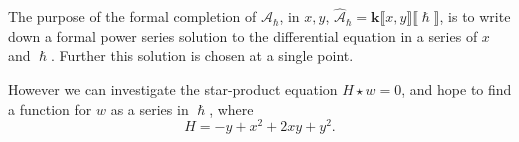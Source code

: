     The purpose of the formal completion of \( \mathcal{A}_{\hslash}\), in \(x,y\), \( \widehat{\mathcal{A}}_{\hslash} = \mathbf{k}\lBrack x, y\rBrack \lBrack \hslash \rBrack\),  is to write down a formal power series solution to the differential equation in a series of \(x\) and \(\hslash\). Further this solution is chosen at a single point.
    
    However we can investigate the star-product equation \( H \star w =0 \), and hope to find a function for \(w\) as a series in \(\hslash\), where 
    \[ H = -y + x^2 + 2 x y + y^2.\]
